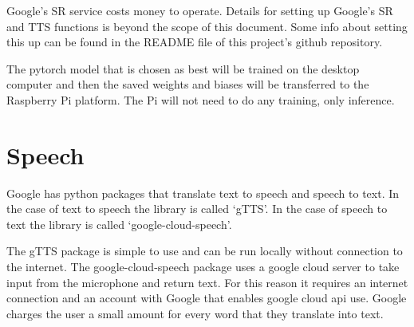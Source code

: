 Google's SR service costs money to operate. Details
for setting up Google's SR and TTS functions is beyond
the scope of this document. Some info about setting this up can be
found in the README file of this project\textquoteright s github
repository.

The pytorch model that is chosen as best will be trained on the
desktop computer and then the saved weights and biases will be transferred
to the Raspberry Pi platform. The Pi will not need to do any training,
only inference. 



\section{Speech}

Google has python packages that translate text to speech and speech to text. In the case of text
to speech the library is called `gTTS'. In the case of speech to text the library is called `google-cloud-speech'. 

The gTTS package is simple to use and can be run locally without connection to the internet. The google-cloud-speech package uses a google cloud server to take input from the microphone and 
return text. For this reason it requires an internet connection and an account with Google that
enables google cloud api use. Google charges the user a small amount for every word that they
translate into text. 

